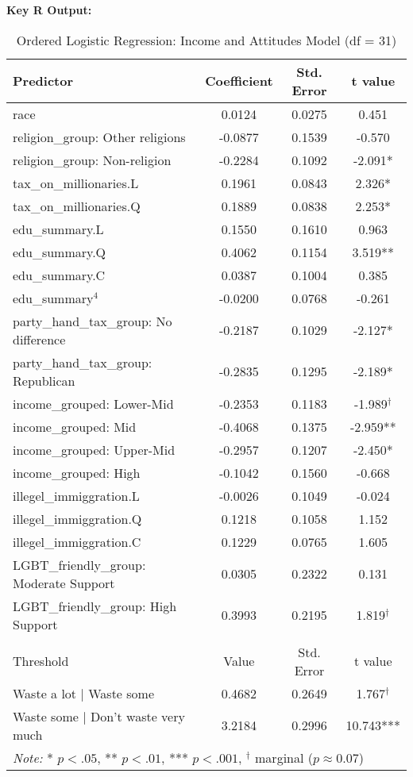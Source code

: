 \documentclass{article}
\begin{document}
\textbf{Key R Output:}
\begin{table}[H]
    \centering
    \caption{Ordered Logistic Regression: Income and Attitudes Model (df = 31)}
    \begin{tabular}{lccc}
    \hline
    \textbf{Predictor} & \textbf{Coefficient} & \textbf{Std. Error} & \textbf{t value} \\
    \hline
    race & 0.0124 & 0.0275 & 0.451 \\
    religion\_group: Other religions & -0.0877 & 0.1539 & -0.570 \\
    religion\_group: Non-religion & -0.2284 & 0.1092 & -2.091* \\
    tax\_on\_millionaries.L & 0.1961 & 0.0843 & 2.326* \\
    tax\_on\_millionaries.Q & 0.1889 & 0.0838 & 2.253* \\
    edu\_summary.L & 0.1550 & 0.1610 & 0.963 \\
    edu\_summary.Q & 0.4062 & 0.1154 & 3.519** \\
    edu\_summary.C & 0.0387 & 0.1004 & 0.385 \\
    edu\_summary$^4$ & -0.0200 & 0.0768 & -0.261 \\
    party\_hand\_tax\_group: No difference & -0.2187 & 0.1029 & -2.127* \\
    party\_hand\_tax\_group: Republican & -0.2835 & 0.1295 & -2.189* \\
    income\_grouped: Lower-Mid & -0.2353 & 0.1183 & -1.989$^\dagger$ \\
    income\_grouped: Mid & -0.4068 & 0.1375 & -2.959** \\
    income\_grouped: Upper-Mid & -0.2957 & 0.1207 & -2.450* \\
    income\_grouped: High & -0.1042 & 0.1560 & -0.668 \\
    illegel\_immiggration.L & -0.0026 & 0.1049 & -0.024 \\
    illegel\_immiggration.Q & 0.1218 & 0.1058 & 1.152 \\
    illegel\_immiggration.C & 0.1229 & 0.0765 & 1.605 \\
    LGBT\_friendly\_group: Moderate Support & 0.0305 & 0.2322 & 0.131 \\
    LGBT\_friendly\_group: High Support & 0.3993 & 0.2195 & 1.819$^\dagger$ \\
    \hline
    \addlinespace[0.5em]
    \multicolumn{4}{l}{\textbf{Intercepts}} \\
    \hline
    Threshold & Value & Std. Error & t value \\
    \hline
    Waste a lot $|$ Waste some & 0.4682 & 0.2649 & 1.767$^\dagger$ \\
    Waste some $|$ Don’t waste very much & 3.2184 & 0.2996 & 10.743*** \\
    \hline
    \multicolumn{4}{l}{\textit{Note:} * $p < .05$, ** $p < .01$, *** $p < .001$, $^\dagger$ marginal ($p \approx 0.07$)} \\
    \end{tabular}
 \end{table}
    
\end{document}
